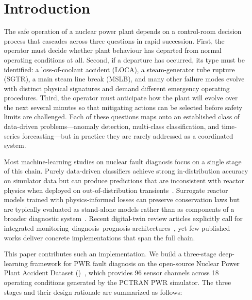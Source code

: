 \section{Introduction}
\label{sec:introduction}

The safe operation of a nuclear power plant depends on a control-room decision process that cascades across three questions in rapid succession. First, the operator must decide whether plant behaviour has departed from normal operating conditions at all. Second, if a departure has occurred, its type must be identified: a loss-of-coolant accident (LOCA), a steam-generator tube rupture (SGTR), a main steam line break (MSLB), and many other failure modes evolve with distinct physical signatures and demand different emergency operating procedures. Third, the operator must anticipate how the plant will evolve over the next several minutes so that mitigating actions can be selected before safety limits are challenged. Each of these questions maps onto an established class of data-driven problems---anomaly detection, multi-class classification, and time-series forecasting---but in practice they are rarely addressed as a coordinated system.

Most machine-learning studies on nuclear fault diagnosis focus on a single stage of this chain. Purely data-driven classifiers achieve strong in-distribution accuracy on simulator data but can produce predictions that are inconsistent with reactor physics when deployed on out-of-distribution transients~\citep{qi2022nppad,zhang2023pinn,santhosh2019survey}. Surrogate reactor models trained with physics-informed losses can preserve conservation laws but are typically evaluated as stand-alone models rather than as components of a broader diagnostic system~\citep{raissi2019pinn,zhang2023pinn,gong2022rom}. Recent digital-twin review articles explicitly call for integrated monitoring--diagnosis--prognosis architectures~\citep{ayodeji2022dtwin,digitaltwin2025review}, yet few published works deliver concrete implementations that span the full chain.

This paper contributes such an implementation. We build a three-stage deep-learning framework for PWR fault diagnosis on the open-source Nuclear Power Plant Accident Dataset (\nppad)~\citep{qi2022nppad}, which provides 96 sensor channels across 18 operating conditions generated by the PCTRAN PWR simulator. The three stages and their design rationale are summarized as follows:

